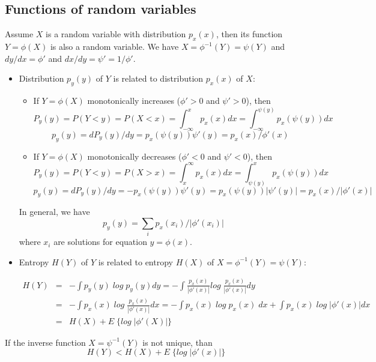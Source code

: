 \documentclass[12pt, a4paper, onecolumn]{IEEEtran}
\begin{document}
\subsection*{Functions of random variables}

Assume $X$ is a random variable with distribution $p_x(x)$, then its function
$Y=\phi(X)$ is also a random variable. We have $X=\phi^{-1}(Y)=\psi(Y)$
and $dy/dx=\phi'$ and $dx/dy=\psi'=1/\phi'$.

\begin{itemize}
\item Distribution $p_y(y)$ of $Y$ is related to distribution $p_x(x)$ of $X$:

\begin{itemize}
\item If $Y=\phi(X)$ monotonically increases ($\phi'>0$ and $\psi'>0$), then
\[ P_y(y)=P(Y<y)=P(X<x)=\int_{-\infty}^x p_x(x)dx
	=\int_{-\infty}^{\psi(y)} p_x(\psi(y))dx	\]
\[ p_y(y)=dP_y(y)/dy=p_x(\psi(y))\psi'(y)=p_x(x)/\phi'(x)	\]
\item If $Y=\phi(X)$ monotonically decreases ($\phi'<0$ and $\psi'<0$), then
\[ P_y(y)=P(Y<y)=P(X>x)=\int_x^{\infty} p_x(x)dx
	=\int_{\psi(y)}^x p_x(\psi(y))dx	\]
\[ p_y(y)=dP_y(y)/dy=-p_x(\psi(y))\psi'(y)=p_x(\psi(y))|\psi'(y)|=p_x(x)/|\phi'(x)| \]
\end{itemize}
In general, we have
\[	p_y(y)=\sum_i p_x(x_i)/|\phi'(x_i)| \]
where $x_i$ are solutions for equation $y=\phi(x)$.

\item Entropy $H(Y)$ of $Y$ is related to entropy $H(X)$ of
$X=\phi^{-1}(Y)=\psi(Y)$:

\begin{eqnarray}
 H(Y) &=& -\int p_y(y) \; log \; p_y(y) dy
	=-\int \frac{p_x(x)}{|\phi'(x)|} log \; \frac{p_x(x)}{|\phi'(x)|} dy
	\nonumber \\
	&=&-\int p_x(x) \; log \; \frac{p_x(x)}{|\phi'(x)|} dx
	=-\int p_x(x) \; log \; p_x(x) \; dx+\int p_x(x)\; log \; |\phi'(x)| dx
	\nonumber \\
	&=&H(X)+E\; \{log\;|\phi'(X)|\}
	\nonumber	\end{eqnarray}

\end{itemize}
If the inverse function $X=\psi^{-1}(Y)$ is not unique, than
\[	H(Y)<H(X)+E\; \{log\;|\phi'(x)|\}	\]
\end{document}
